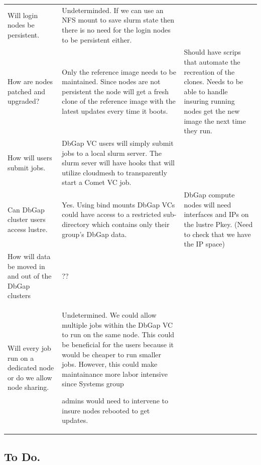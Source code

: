 \begin{table}
\begin{tabular}{|p{4cm}|p{4cm}|p{4cm}|}
Will login nodes be persistent.
& 
Undeterminded. If we can use an NFS mount to save slurm state then there
is no need for the login nodes to be persistent either.
& 
~
\\

How are nodes patched and upgraded?
 & 
Only the reference image needs to be maintained. Since nodes are not
persistent the
node will get a fresh clone of the reference image with the latest
updates every time it
boots.
 & 
Should have scrips that automate the recreation of the
clones. Needs to be able to handle insuring running nodes
get the new image the next time they run.
\\

How will users submit jobs.
 & 
DbGap VC users will simply submit jobs to a local slurm server. The
slurm sever will have
hooks that will utilize cloudmesh to transparently start a Comet VC
job.
 & 
~
\\

Can DbGap cluster users access lustre.
 & 
Yes. Using bind mounts DbGap VCs could have access to a restricted
sub-directory
which contains only their group's DbGap data.
 & 
DbGap compute nodes will need interfaces and IPs on
the lustre Pkey. (Need to check that we have the IP
space)
\\
How will data be moved in and out of the DbGap clusters & ?? &
~\\

Will every job run on a dedicated node or do we allow node
sharing.
 & 
Undetermined. We could allow multiple jobs within the DbGap VC to run on
the same
node. This could be beneficial for the users because it would be cheaper to run smaller
jobs. However, this could make maintainance more labor intensive since
Systems group

admins would need to intervene to insure nodes rebooted to get
updates. & ~ 
\\
\bottomrule
\end{tabular}
\end{table}

\subsection{To Do.}

